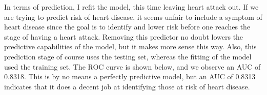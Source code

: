 \documentclass[12pt]{article}
\begin{document}
\medskip In terms of prediction, I refit the model, this time leaving heart attack out. If we are trying to predict risk of heart disease, it seems unfair to include a symptom of heart disease since the goal is to identify and lower risk before one reaches the stage of having a heart attack. Removing this predictor no doubt lowers the predictive capabilities of the model, but it makes more sense this way. Also, this prediction stage of course uses the testing set, whereas the fitting of the model used the training set. The ROC curve is shown below, and we observe an AUC of 0.8318. This is by no means a perfectly predictive model, but an AUC of 0.8313 indicates that it does a decent job at identifying those at risk of heart disease.

\end{document}
